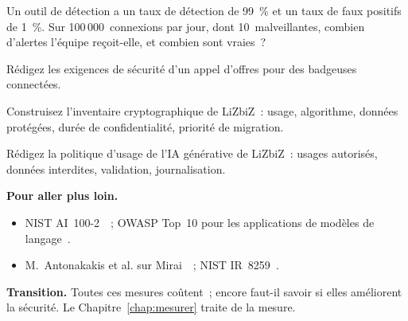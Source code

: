 \begin{boxexo}[title={\ding{45}\quad Exercice~25.7. Faux positifs \niveaumoyen}]
Un outil de détection a un taux de détection de 99~\% et un taux de faux
positifs de 1~\%. Sur 100\,000~connexions par jour, dont 10~malveillantes,
combien d'alertes l'équipe reçoit-elle, et combien sont vraies~?
\end{boxexo}

\begin{boxexo}[title={\ding{45}\quad Exercice~25.8. L'achat \niveaumoyen}]
Rédigez les exigences de sécurité d'un appel d'offres pour des
badgeuses connectées.
\end{boxexo}

\begin{boxexo}[title={\ding{45}\quad Exercice~25.9. Inventaire cryptographique \niveauexpert}]
Construisez l'inventaire cryptographique de LiZbiZ~: usage, algorithme,
données protégées, durée de confidentialité, priorité de migration.
\end{boxexo}

\begin{boxexo}[title={\ding{45}\quad Exercice~25.10. Une politique d'usage de l'IA \niveauexpert}]
Rédigez la politique d'usage de l'IA générative de LiZbiZ~: usages
autorisés, données interdites, validation, journalisation.
\end{boxexo}

\bigskip

\begin{boxinfo}
\textbf{Pour aller plus loin.}
\begin{itemize}
    \item NIST AI~100-2~\cite{nist2023aml}~; OWASP Top~10 pour les
          applications de modèles de langage~\cite{owasp2023llm}.
    \item M.~Antonakakis et al. sur Mirai~\cite{antonakakis2017mirai}~;
          NIST IR~8259~\cite{nistir8259}.
\end{itemize}
\end{boxinfo}

\begin{boxinfo}
\textbf{Transition.} Toutes ces mesures coûtent~; encore faut-il savoir si
elles améliorent la sécurité. Le Chapitre~\ref{chap:mesurer} traite de la
mesure.
\end{boxinfo}
